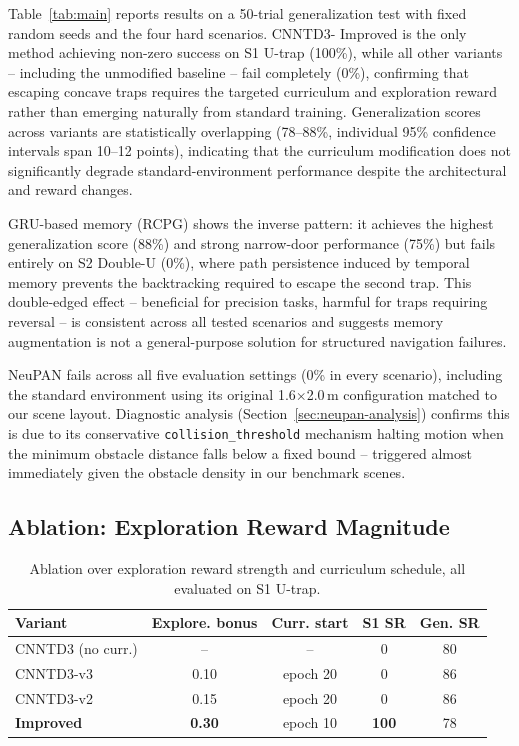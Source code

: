 Table~\ref{tab:main} reports results on a 50-trial generalization
test with fixed random seeds and the four hard scenarios. CNNTD3-
Improved is the only method achieving non-zero success on S1 U-trap
(100\%), while all other variants -- including the unmodified
baseline -- fail completely (0\%), confirming that escaping concave
traps requires the targeted curriculum and exploration reward rather
than emerging naturally from standard training. Generalization scores
across variants are statistically overlapping
(78--88\%, individual 95\% confidence intervals span 10--12 points),
indicating that the curriculum modification does not significantly
degrade standard-environment performance despite the architectural
and reward changes.

GRU-based memory (RCPG) shows the inverse pattern: it achieves the
highest generalization score (88\%) and strong narrow-door performance
(75\%) but fails entirely on S2 Double-U (0\%), where path persistence
induced by temporal memory prevents the backtracking required to
escape the second trap. This double-edged effect -- beneficial for
precision tasks, harmful for traps requiring reversal -- is consistent
across all tested scenarios and suggests memory augmentation is not a
general-purpose solution for structured navigation failures.

NeuPAN fails across all five evaluation settings (0\% in every
scenario), including the standard environment using its original
1.6$\times$2.0\,m configuration matched to our scene layout. Diagnostic
analysis (Section~\ref{sec:neupan-analysis}) confirms this is due to
its conservative \texttt{collision\_threshold} mechanism halting motion
when the minimum obstacle distance falls below a fixed bound --
triggered almost immediately given the obstacle density in our
benchmark scenes.

\subsection{Ablation: Exploration Reward Magnitude}

\begin{table}[t]
\centering
\caption{Ablation over exploration reward strength and curriculum
schedule, all evaluated on S1 U-trap.}
\label{tab:ablation}
\begin{tabular}{lcccc}
\toprule
Variant & Explore. bonus & Curr. start & S1 SR & Gen. SR \\
\midrule
CNNTD3 (no curr.) & --   & --       & 0   & 80 \\
CNNTD3-v3          & 0.10 & epoch 20 & 0   & 86 \\
CNNTD3-v2          & 0.15 & epoch 20 & 0   & 86 \\
\textbf{Improved}  & \textbf{0.30} & epoch 10 & \textbf{100} & 78 \\
\bottomrule
\end{tabular}
\end{table}

